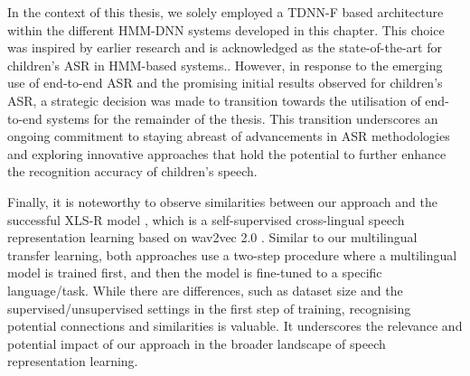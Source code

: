 In the context of this thesis, we solely employed a \ac{TDNN-F} based architecture within the different \ac{HMM-DNN} systems developed in this chapter. This choice was inspired by earlier research \cite{tdnnf-children} and is acknowledged as the state-of-the-art for children's \ac{ASR} in \ac{HMM}-based systems.\cite{tdnnf-children}. However, in response to the emerging use of end-to-end \ac{ASR} and the promising initial results observed for children's \ac{ASR}, a strategic decision was made to transition towards the utilisation of end-to-end systems for the remainder of the thesis. This transition underscores an ongoing commitment to staying abreast of advancements in \ac{ASR} methodologies and exploring innovative approaches that hold the potential to further enhance the recognition accuracy of children's speech.

Finally, it is noteworthy to observe similarities between our approach and the successful XLS-R model \cite{babu2021xlsr}, which is a self-supervised cross-lingual speech representation learning based on wav2vec 2.0 \cite{baevski2020wav2vec}. Similar to our multilingual transfer learning, both approaches use a two-step procedure where a multilingual model is trained first, and then the model is fine-tuned to a specific language/task. While there are differences, such as dataset size and the supervised/unsupervised settings in the first step of training, recognising potential connections and similarities is valuable. It underscores the relevance and potential impact of our approach in the broader landscape of speech representation learning.

